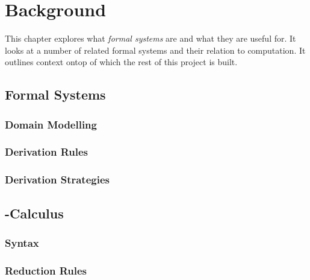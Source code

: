 \chapter{Background}

This chapter explores what \emph{formal systems} are and what they are useful for. It looks at a number of related formal systems and their relation to computation. It outlines context ontop of which the rest of this project is built.

\section{Formal Systems}

\subsection{Domain Modelling}
\subsection{Derivation Rules}
\subsection{Derivation Strategies}

\section{\lam-Calculus}

\subsection{Syntax}

  \begin{figure}[!h]
  \end{figure}

\subsection{Reduction Rules}

  \begin{figure}[!h]
  \end{figure}

